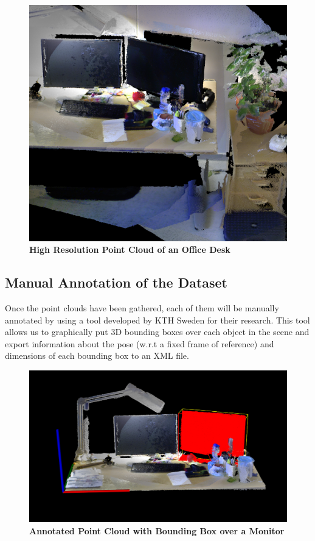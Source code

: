 \documentclass[12pt]{article}
\begin{document}
\begin{figure} [H]
\includegraphics[scale = 0.30]{pcl.png}
\centering
\caption{\textbf{High Resolution Point Cloud of an Office Desk \cite{KTH Dataset}}} 
\end{figure}


\subsection{Manual Annotation of the Dataset}

Once the point clouds have been gathered, each of them will be manually annotated by using a tool developed by KTH Sweden for their research. This tool allows us to graphically put 3D bounding boxes over each object in the scene and export information about the pose (w.r.t a fixed frame of reference) and dimensions of each bounding box to an XML file.

\begin{figure} [H]
\includegraphics[scale = 0.30]{pcl_annotated.png}
\centering
\caption{\textbf{Annotated Point Cloud with Bounding Box over a Monitor \cite{KTH Dataset}}} 
\end{figure}
\end{document}
